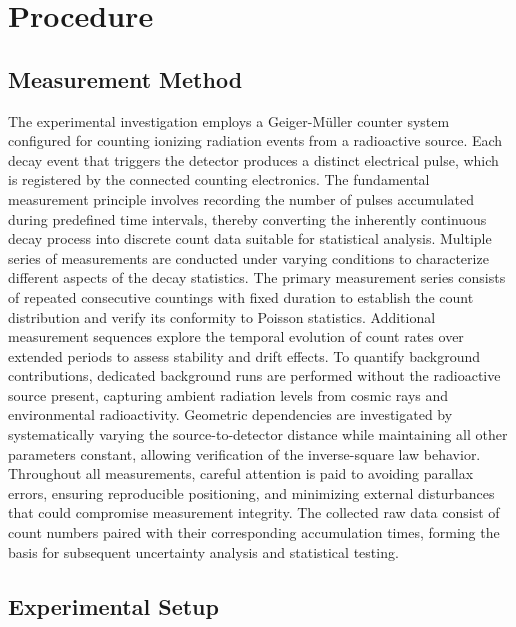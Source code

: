 \chapter{Procedure} \label{ch:Procedure}

\section{Measurement Method} \label{sec:MeasurementMethod}

The experimental investigation employs a Geiger-Müller counter system configured for counting ionizing radiation events from a radioactive source. Each decay event that triggers the detector produces a distinct electrical pulse, which is registered by the connected counting electronics. The fundamental measurement principle involves recording the number of pulses accumulated during predefined time intervals, thereby converting the inherently continuous decay process into discrete count data suitable for statistical analysis. Multiple series of measurements are conducted under varying conditions to characterize different aspects of the decay statistics. The primary measurement series consists of repeated consecutive countings with fixed duration to establish the count distribution and verify its conformity to Poisson statistics. Additional measurement sequences explore the temporal evolution of count rates over extended periods to assess stability and drift effects. To quantify background contributions, dedicated background runs are performed without the radioactive source present, capturing ambient radiation levels from cosmic rays and environmental radioactivity. Geometric dependencies are investigated by systematically varying the source-to-detector distance while maintaining all other parameters constant, allowing verification of the inverse-square law behavior. Throughout all measurements, careful attention is paid to avoiding parallax errors, ensuring reproducible positioning, and minimizing external disturbances that could compromise measurement integrity. The collected raw data consist of count numbers paired with their corresponding accumulation times, forming the basis for subsequent uncertainty analysis and statistical testing.

\section{Experimental Setup} \label{sec:ExperimentalSetup}

